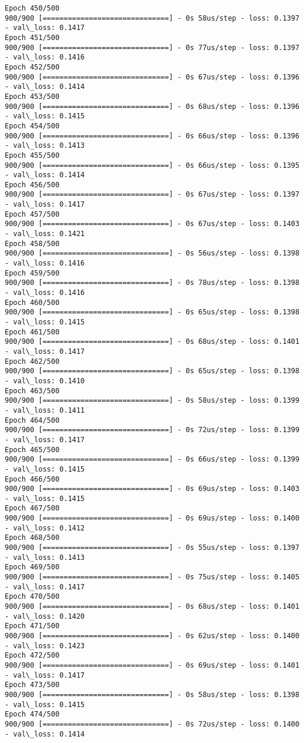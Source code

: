 \documentclass[11pt]{article}
\begin{document}
\begin{Verbatim}[commandchars=\\\{\}]
Epoch 450/500
900/900 [==============================] - 0s 58us/step - loss: 0.1397 - val\_loss: 0.1417
Epoch 451/500
900/900 [==============================] - 0s 77us/step - loss: 0.1397 - val\_loss: 0.1416
Epoch 452/500
900/900 [==============================] - 0s 67us/step - loss: 0.1396 - val\_loss: 0.1414
Epoch 453/500
900/900 [==============================] - 0s 68us/step - loss: 0.1396 - val\_loss: 0.1415
Epoch 454/500
900/900 [==============================] - 0s 66us/step - loss: 0.1396 - val\_loss: 0.1413
Epoch 455/500
900/900 [==============================] - 0s 66us/step - loss: 0.1395 - val\_loss: 0.1414
Epoch 456/500
900/900 [==============================] - 0s 67us/step - loss: 0.1397 - val\_loss: 0.1417
Epoch 457/500
900/900 [==============================] - 0s 67us/step - loss: 0.1403 - val\_loss: 0.1421
Epoch 458/500
900/900 [==============================] - 0s 56us/step - loss: 0.1398 - val\_loss: 0.1416
Epoch 459/500
900/900 [==============================] - 0s 78us/step - loss: 0.1398 - val\_loss: 0.1416
Epoch 460/500
900/900 [==============================] - 0s 65us/step - loss: 0.1398 - val\_loss: 0.1415
Epoch 461/500
900/900 [==============================] - 0s 68us/step - loss: 0.1401 - val\_loss: 0.1417
Epoch 462/500
900/900 [==============================] - 0s 65us/step - loss: 0.1398 - val\_loss: 0.1410
Epoch 463/500
900/900 [==============================] - 0s 58us/step - loss: 0.1399 - val\_loss: 0.1411
Epoch 464/500
900/900 [==============================] - 0s 72us/step - loss: 0.1399 - val\_loss: 0.1417
Epoch 465/500
900/900 [==============================] - 0s 66us/step - loss: 0.1399 - val\_loss: 0.1415
Epoch 466/500
900/900 [==============================] - 0s 69us/step - loss: 0.1403 - val\_loss: 0.1415
Epoch 467/500
900/900 [==============================] - 0s 69us/step - loss: 0.1400 - val\_loss: 0.1412
Epoch 468/500
900/900 [==============================] - 0s 55us/step - loss: 0.1397 - val\_loss: 0.1413
Epoch 469/500
900/900 [==============================] - 0s 75us/step - loss: 0.1405 - val\_loss: 0.1417
Epoch 470/500
900/900 [==============================] - 0s 68us/step - loss: 0.1401 - val\_loss: 0.1420
Epoch 471/500
900/900 [==============================] - 0s 62us/step - loss: 0.1400 - val\_loss: 0.1423
Epoch 472/500
900/900 [==============================] - 0s 69us/step - loss: 0.1401 - val\_loss: 0.1417
Epoch 473/500
900/900 [==============================] - 0s 58us/step - loss: 0.1398 - val\_loss: 0.1415
Epoch 474/500
900/900 [==============================] - 0s 72us/step - loss: 0.1400 - val\_loss: 0.1414

\end{Verbatim}
\end{document}
